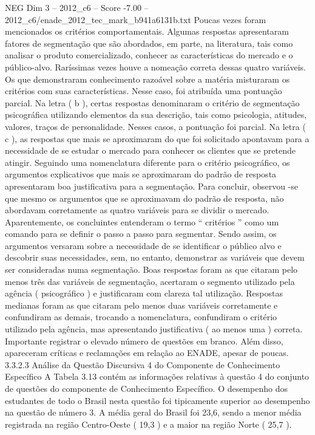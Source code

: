 \begin{textsample}{NEG Dim 3 – 2012\_c6 – Score -7.00 – 2012\_c6/enade\_2012\_tec\_mark\_b941a6131b.txt}
Poucas vezes foram mencionados os critérios comportamentais.
Algumas respostas apresentaram fatores de segmentação que são abordados, em parte, na literatura, tais como analisar o produto comercializado, conhecer as características do mercado e o público-alvo.
Raríssimas vezes houve a nomeação correta dessas quatro variáveis.
Os que demonstraram conhecimento razoável sobre a matéria misturaram os critérios com suas características.
Nesse caso, foi atribuída uma pontuação parcial.
Na letra ( b ), certas respostas denominaram o critério de segmentação psicográfica utilizando elementos da sua descrição, tais como psicologia, atitudes, valores, traços de personalidade.
Nesses casos, a pontuação foi parcial.
Na letra ( c ), as respostas que mais se aproximaram do que foi solicitado apontavam para a necessidade de se estudar o mercado para conhecer os clientes que se pretende atingir.
Seguindo uma nomenclatura diferente para o critério psicográfico, os argumentos explicativos que mais se aproximaram do padrão de resposta apresentaram boa justificativa para a segmentação.
Para concluir, observou -se que mesmo os argumentos que se aproximavam do padrão de resposta, não abordavam corretamente as quatro variáveis para se dividir o mercado.
Aparentemente, os concluintes entenderam o termo “ critérios ” como um comando para se definir o passo a passo para segmentar.
Sendo assim, os argumentos versaram sobre a necessidade de se identificar o público alvo e descobrir suas necessidades, sem, no entanto, demonstrar as variáveis que devem ser consideradas numa segmentação.
Boas respostas foram as que citaram pelo menos três das variáveis de segmentação, acertaram o segmento utilizado pela agência ( psicográfico ) e justificaram com clareza tal utilização.
Respostas medianas foram as que citaram pelo menos duas variáveis corretamente e confundiram as demais, trocando a nomenclatura, confundiram o critério utilizado pela agência, mas apresentando justificativa ( ao menos uma ) correta.
Importante registrar o elevado número de questões em branco.
Além disso, apareceram críticas e reclamações em relação ao ENADE, apesar de poucas. 3.3.2.3 Análise da Questão Discursiva 4 do Componente de Conhecimento Específico A Tabela 3.13 contém as informações relativas à questão 4 do conjunto de questões do componente de Conhecimento Específico.
O desempenho dos estudantes de todo o Brasil nesta questão foi tipicamente superior ao desempenho na questão de número 3.
A média geral do Brasil foi 23,6, sendo a menor média registrada na região Centro-Oeste ( 19,3 ) e a maior na região Norte ( 25,7 ).

\end{textsample}
